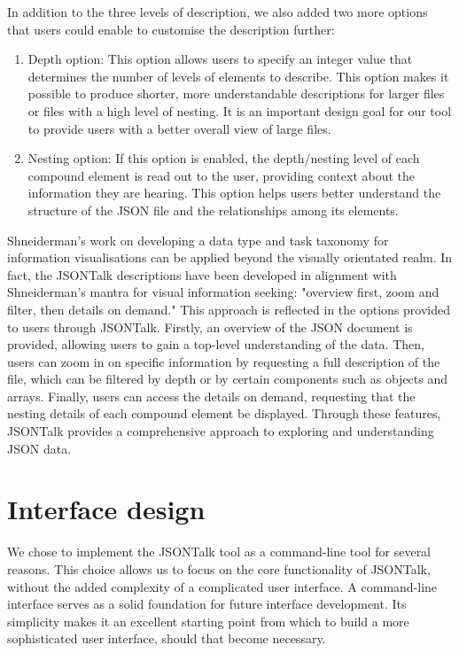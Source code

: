 \documentclass{l4proj}
\begin{document}
In addition to the three levels of description, we also added two more options that users could enable to customise the description further:

\begin{enumerate}
    \item Depth option: This option allows users to specify an integer value that determines the number of levels of elements to describe. This option makes it possible to produce shorter, more understandable descriptions for larger files or files with a high level of nesting. It is an important design goal for our tool to provide users with a better overall view of large files.
    \item Nesting option: If this option is enabled, the depth/nesting level of each compound element is read out to the user, providing context about the information they are hearing. This option helps users better understand the structure of the JSON file and the relationships among its elements.
\end{enumerate}

Shneiderman's work on developing a data type and task taxonomy for information visualisations \cite{Shneiderman_2003} can be applied beyond the visually orientated realm. In fact, the JSONTalk descriptions have been developed in alignment with Shneiderman's mantra for visual information seeking: "overview first, zoom and filter, then details on demand." This approach is reflected in the options provided to users through JSONTalk. Firstly, an overview of the JSON document is provided, allowing users to gain a top-level understanding of the data. Then, users can zoom in on specific information by requesting a full description of the file, which can be filtered by depth or by certain components such as objects and arrays. Finally, users can access the details on demand, requesting that the nesting details of each compound element be displayed. Through these features, JSONTalk provides a comprehensive approach to exploring and understanding JSON data.

\section{Interface design}

We chose to implement the JSONTalk tool as a command-line tool for several reasons. This choice allows us to focus on the core functionality of JSONTalk, without the added complexity of a complicated user interface. A command-line interface serves as a solid foundation for future interface development. Its simplicity makes it an excellent starting point from which to build a more sophisticated user interface, should that become necessary.
\end{document}
